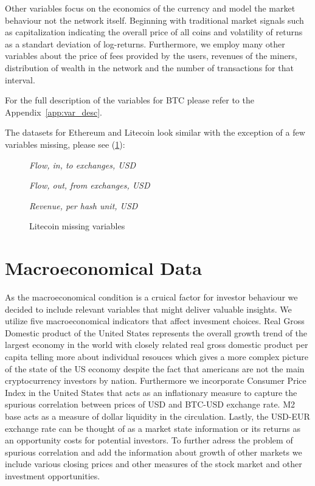 Other variables focus on the economics of the currency and model the market behaviour not the network itself. 
Beginning with traditional market signals such as capitalization indicating the overall price of all coins and volatility of returns 
as a standart deviation of log-returns. Furthermore, we employ many other variables about the price of fees 
provided by the users, revenues of the miners, distribution of wealth in the network and the number of transactions for that interval.


For the full description of the variables for \ac{BTC} please refer to the Appendix~\ref{app:var_desc}.


The datasets for Ethereum and Litecoin look similar with the exception of a few variables missing,
please see (\ref{litecoin:missing}):

    \begin{figure}[!htbp]
        \begin{center}
        \caption{Litecoin missing variables}\label{litecoin:missing}
        \begin{boxeditemize}
            \item \textit{Flow, in, to exchanges, USD}
            \item \textit{Flow, out, from exchanges, USD}
            \item \textit{Revenue, per hash unit, USD}
        \end{boxeditemize}
        \end{center}
        \end{figure}


\section{Macroeconomical Data}

As the macroeconomical condition is a cruical factor for investor behaviour 
we decided to include relevant variables that might deliver valuable
insights. We utilize five macroeconomical indicators that affect invesment choices.
Real Gross Domestic product of the United States represents the overall
growth trend of the largest economy in the world with closely related real
gross domestic product per capita telling more about individual resouces which
gives a more complex picture of the state of the US economy despite the 
fact that americans are not the main cryptocurrency investors by nation.
Furthermore we incorporate Consumer Price Index in the United States that
acts as an inflationary measure to capture the spurious correlation between 
prices of USD and BTC-USD exchange rate. M2 base acts as a measure
of dollar liquidity in the circulation. Lastly, the USD-EUR exchange rate
can be thought of as a market state information or its returns as an 
opportunity costs for potential investors. To further adress the problem of spurious
correlation and add the information about growth of other markets we include
various closing prices and other measures of the stock market and other 
investment opportunities. 


